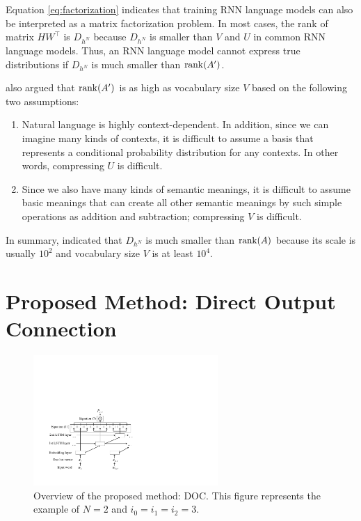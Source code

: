 \documentclass[11pt,a4paper]{article}
\begin{document}
Equation \ref{eq:factorization} indicates that training RNN language models can also be interpreted as a matrix factorization problem.
In most cases, the rank of matrix $H W^{\top}$ is $D_{h^N}$ because $D_{h^N}$ is smaller than $V$ and $U$ in common RNN language models.
Thus, an RNN language model cannot express true distributions if $D_{h^N}$ is much smaller than ${\rm rank}(A')$.


 also argued that ${\rm rank}(A')$ is as high as vocabulary size $V$ based on the following two assumptions:
\begin{enumerate}
  \item Natural language is highly context-dependent. In addition, since we can imagine many kinds of contexts, it is difficult to assume a basis that represents a conditional probability distribution for any contexts. In other words, compressing $U$ is difficult.
  \item Since we also have many kinds of semantic meanings, it is difficult to assume basic meanings that can create all other semantic meanings by such simple operations as addition and subtraction; compressing $V$ is difficult.
\end{enumerate}
In summary,  indicated that $D_{h^N}$ is much smaller than ${\rm rank}(A)$ because its scale is usually $10^2$ and vocabulary size $V$ is at least $10^4$.



\section{Proposed Method: Direct Output Connection}
\begin{figure}[!t]
  \centering
  \includegraphics[width=7cm]{./overview.pdf}
   \caption{Overview of the proposed method: DOC. This figure represents the example of $N=2$ and $i_{0} = i_{1} = i_{2} = 3$.}
   \label{fig:overview}
\end{figure}
\end{document}
